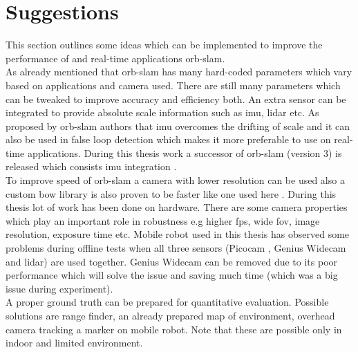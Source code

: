 \section{Suggestions}
This section outlines some ideas which can be implemented to improve the performance of and real-time applications \acrshort{orb}-\acrshort{slam}.\\
\newline As already mentioned that \acrshort{orb}-\acrshort{slam} has many hard-coded parameters which vary based on applications and camera used. There are still many parameters which can be tweaked to improve accuracy and efficiency both. An extra sensor can be integrated to provide absolute scale information such as \acrshort{imu}, \acrshort{lidar} etc. As proposed by \acrshort{orb}-\acrshort{slam} authors \cite{orbslam} that \acrshort{imu} overcomes the drifting of scale and it can also be used in false loop detection which makes it more preferable to use on real-time applications. During this thesis work a successor of \acrshort{orb}-\acrshort{slam} (version 3) is released which consists \acrshort{imu} integration \cite{ORBSLAM3}. \\
\newline To improve speed of \acrshort{orb}-\acrshort{slam} a camera with lower resolution can be used also a custom \acrshort{bow} library is also proven to be faster like one used here \cite{Fbow}. During this thesis lot of work has been done on hardware. There are some camera properties which play an important role in robustness e.g higher \acrshort{fps}, wide \acrshort{fov}, image resolution, exposure time etc. Mobile robot used in this thesis has observed some problems during offline tests when all three sensors (Picocam , Genius Widecam and \acrshort{lidar}) are used together. Genius Widecam can be removed due to its poor performance which will solve the issue and saving much time (which was a big issue during experiment). \\
\newline A proper ground truth can be prepared for quantitative evaluation. Possible solutions are range finder, an already prepared map of environment, overhead camera tracking a marker on mobile robot. Note that these are possible only in indoor and limited environment.  